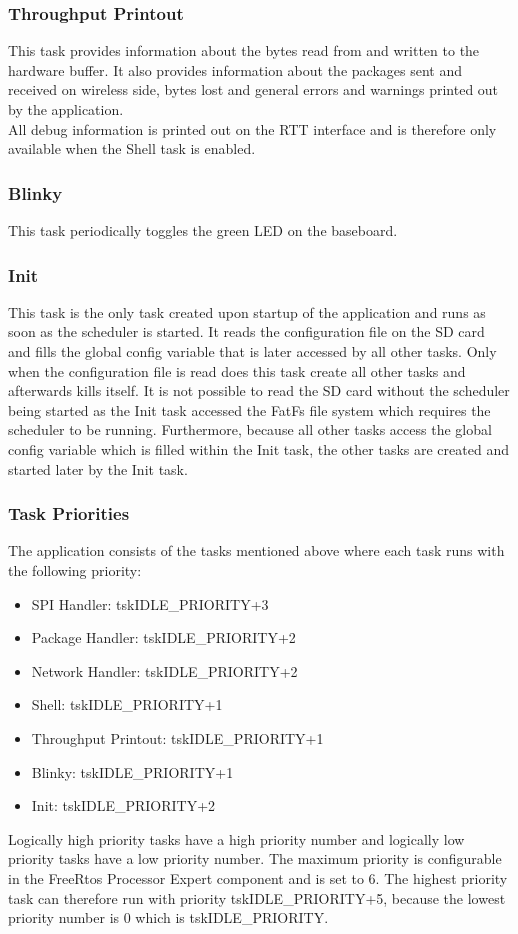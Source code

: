 \subsubsection{Throughput Printout}
This task provides information about the bytes read from and written to the hardware buffer. It also provides information about the packages sent and received on wireless side, bytes lost and general errors and warnings printed out by the application.\\
All debug information is printed out on the RTT interface and is therefore only available when the Shell task is enabled.
%
\subsubsection{Blinky}
This task periodically toggles the green LED on the baseboard.
%
\subsubsection{Init}
This task is the only task created upon startup of the application and runs as soon as the scheduler is started. It reads the configuration file on the SD card and fills the global config variable that is later accessed by all other tasks. Only when the configuration file is read does this task create all other tasks and afterwards kills itself. It is not possible to read the SD card without the scheduler being started as the Init task accessed the FatFs file system which requires the scheduler to be running. Furthermore, because all other tasks access the global config variable which is filled within the Init task, the other tasks are created and started later by the Init task.
%
\subsubsection{Task Priorities} \label{subsec:txtTaskPriorities}
The application consists of the tasks mentioned above where each task runs with the following priority:
\begin{itemize}
    \item SPI Handler:			\tab tskIDLE\_PRIORITY+3
    \item Package Handler:		\tab tskIDLE\_PRIORITY+2
    \item Network Handler:		\tab tskIDLE\_PRIORITY+2
    \item Shell:				\tab tskIDLE\_PRIORITY+1
    \item Throughput Printout:	\tab tskIDLE\_PRIORITY+1
    \item Blinky:				\tab tskIDLE\_PRIORITY+1
    \item Init:					\tab tskIDLE\_PRIORITY+2
\end{itemize}
Logically high priority tasks have a high priority number and logically low priority tasks have a low priority number. The maximum priority is configurable in the FreeRtos Processor Expert component and is set to 6. The highest priority task can therefore run with priority tskIDLE\_PRIORITY+5, because the lowest priority number is 0 which is tskIDLE\_PRIORITY.
%
